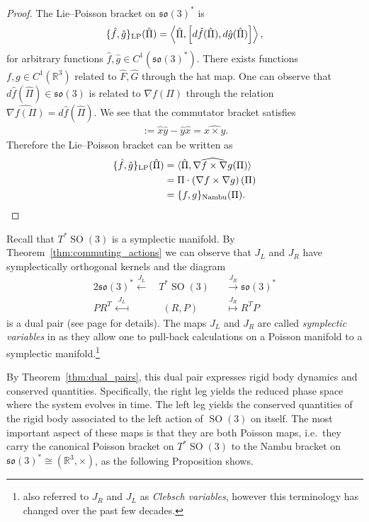 \documentclass[12pt]{amsart}
\newcommand{\so}{\ensuremath{\mathfrak{so}}}
\DeclareMathOperator{\SO}{SO}
\begin{document}
  \begin{proof}
    The Lie--Poisson bracket on $\so(3)^*$ is
    \begin{align*}
      \{ \hat{f} , \hat{g} \}_{\rm LP} (\hat{\Pi}) =
      \left \langle \hat{\Pi} , \left[ d\hat{f}(\hat{\Pi}) , d\hat{g}(\hat{\Pi}) \right]
        \right \rangle,
    \end{align*}
    for arbitrary functions $\hat{f},\hat{g} \in C^1(\so(3)^*)$.
    There exists functions $f,g \in C^1(\mathbb{R}^3)$ related to $\hat{F},\hat{G}$ through the hat map.
    One can observe that $d\hat{f}(\hat{\Pi}) \in \so(3)$ is 
    related to $\nabla f(\Pi)$ through the relation $\widehat{ \nabla f(\Pi)} = d\hat{f}( \hat{\Pi})$.
    We see that the commutator bracket satisfies
    \begin{align*}
      [\hat{x},\hat{y} ] := \hat{x} \hat{y} - \hat{y} \hat{x} = \widehat{x \times y }.
    \end{align*}
    Therefore the Lie--Poisson bracket can be written as
    \begin{align*}
    \{ \hat{f} , \hat{g} \}_{\rm LP}(\hat{\Pi})
    &= \langle \hat{\Pi} , \widehat{ \nabla f \times \nabla g }(\Pi) \rangle \\
    &= \Pi \cdot  \left( \nabla f \times \nabla g \right)(\Pi) \\
    &= \{ f , g \}_{\rm Nambu}(\Pi).
    \end{align*}
  \end{proof}

  Recall that $T^*\SO(3)$ is a symplectic manifold.
  By Theorem~\ref{thm:commuting_actions}
  we can observe that $J_L$ and $J_R$ have symplectically
  orthogonal kernels and the diagram
  \begin{alignat*}{2}
    \so(3)^* \stackrel{J_L}{\longleftarrow}&
    \,T^* \SO(3)
    &&\stackrel{J_R}{\longrightarrow} \so(3)^* \\
     PR^T \stackrel{J_L}{\longmapsfrom}&
    \;\; (R,P)
    &&\stackrel{J_R}{\longmapsto} R^TP
  \end{alignat*}
  is a dual pair
  (see page \pageref{thm:dual_pairs} for details).
  The maps $J_L$ and $J_R$ are called \emph{symplectic variables} in \cite{MarsdenWeinstein1983}
  as they allow one to pull-back calculations on a Poisson manifold to a symplectic manifold.\footnote{
  	\cite{MarsdenWeinstein1983} also referred to $J_R$ and $J_L$ as \emph{Clebsch variables},
		however this terminology has changed over the past few decades.}

  By Theorem~\ref{thm:dual_pairs}, this dual pair expresses rigid
  body dynamics and conserved quantities.
  Specifically, the right leg yields the reduced phase space where 
  the system evolves in time.
  The left leg yields the conserved quantities of the rigid body
  associated to the left action of $\SO(3)$ on itself.
  The most important aspect of these maps is that they are both Poisson
  maps, i.e.\ they carry the canonical Poisson bracket on $T^* \SO(3)$
  to the Nambu bracket on $\so(3)^* \cong (\mathbb{R}^3,\times)$,
  as the following Proposition shows.
\end{document}
